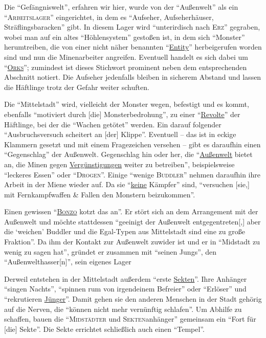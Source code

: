\documentclass[a5paper,pagesize,numbers=noenddot]{scrbook}
\begin{document}
Die \enquote{Gefängniswelt}, erfahren wir hier, wurde von der \enquote{Außenwelt} als ein \enquote{\textsc{Arbeitslager}} eingerichtet, in dem es \enquote{Aufseher, Aufseherhäuser, Sträflingsbaracken} gibt.
In diesem Lager wird \enquote{unterirdisch nach \textsc{Erz}} gegraben, wobei man auf ein altes \enquote{Höhlensystem} gestoßen ist, in dem sich \enquote{Monster} herumtreiben, die von einer nicht näher benannten \enquote{\uline{Entity}} herbeigerufen worden sind und nun die Minenarbeiter angreifen.
Eventuell handelt es sich dabei um \enquote{\textsc{\uline{Orks}}}; zumindest ist dieses Stichwort prominent neben dem entsprechenden Abschnitt notiert.
Die Aufseher jedenfalls bleiben in sicherem Abstand und lassen die Häftlinge trotz der Gefahr weiter schuften.

Die \enquote{Mittelstadt} wird, vielleicht der Monster wegen, befestigt und es kommt, ebenfalls \enquote{motiviert durch [die] Monsterbedrohung}, zu einer \enquote{\uline{Revolte}} der Häftlinge, bei der die \enquote{Wachen getötet} werden.
Ein darauf folgender \enquote{Ausbruchsversuch scheitert an [der] Klippe}.
Eventuell -- das ist in eckige Klammern gesetzt und mit einem Fragezeichen versehen -- gibt es daraufhin einen \enquote{Gegenschlag} der Außenwelt.
Gegenschlag hin oder her, die \enquote{\uline{Außenwelt} bietet an, die Minen gegen \uline{Vergünstigungen} weiter zu betreiben}, beispielsweise \enquote{leckeres Essen} oder \enquote{\textsc{Drogen}}.
Einige \enquote{wenige \textsc{Buddler}} nehmen daraufhin ihre Arbeit in der Miene wieder auf. Da sie \enquote{\uline{keine} Kämpfer} sind, \enquote{versuchen [sie,] mit Fernkampfwaffen \& Fallen den Monstern beizukommen}.

Einen gewissen \enquote{\textsc{\uline{Bonzo}} kotzt das an}.
Er stört sich an dem Arrangement mit der Außenwelt und möchte stattdessen \enquote{geeinigt der Außenwelt entgegentreten[,] aber die \enquote{weichen} Buddler und die Egal-Typen aus Mittelstadt sind eine zu große Fraktion}.
Da ihm der Kontakt zur Außenwelt zuwider ist und er in \enquote{Midstadt zu wenig zu sagen hat}, gründet er zusammen mit \enquote{seinen Jungs}, den \enquote{Außenwelthasser[n]}, sein eigenes Lager

Derweil entstehen in der Mittelstadt außerdem \enquote{erste \uline{Sekten}}.
Ihre Anhänger \enquote{singen Nachts}, \enquote{spinnen rum von irgendeinem Befreier} oder \enquote{Erlöser} und \enquote{rekrutieren \uline{Jünger}}.
Damit gehen sie den anderen Menschen in der Stadt gehörig auf die Nerven, die \enquote{können nicht mehr vernünftig schlafen}.
Um Abhilfe zu schaffen, bauen die \enquote{\textsc{Midstädter} und \textsc{Sekten}anhänger} gemeinsam ein \enquote{Fort für [die] Sekte}.
Die Sekte errichtet schließlich auch einen \enquote{Tempel}.
\end{document}
